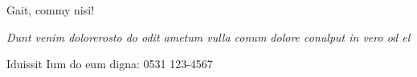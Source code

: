 \documentclass[a3paper,style=bulletin]{tubsposter}
\begin{document}
  \begin{tubsposter}
    \vspace*{100pt}
    {
      Gait, commy nisi!\par\vspace*{1.5ex}}
    {\itshape\huge\color{tuRed}
      Dunt venim dolorerosto do odit
      ametum vulla conum dolore
      co\-nulput in vero od el\par}
    \vfill\vfill
    \Large
      Iduissit Ium do eum digna: 0531 123-4567
  \end{tubsposter}
\end{document}
